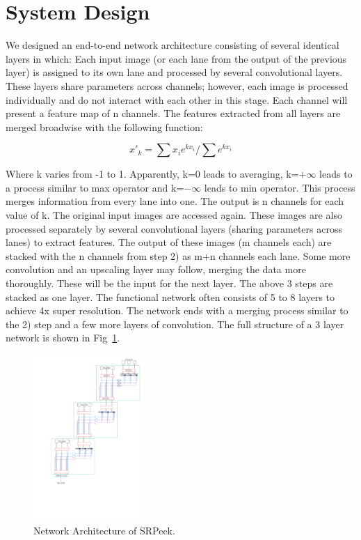 \section{System Design}
\label{sec-design}
We designed an end-to-end network architecture consisting of several identical layers in which:
	Each input image (or each lane from the output of the previous layer) is assigned to its own lane and processed by several convolutional layers. These layers share parameters across channels; however, each image is processed individually and do not interact with each other in this stage. Each channel will present a feature map of n channels.
	The features extracted from all layers are merged broadwise with the following function:


    $${x'_k=\sum x_ie^{kx_i}/\sum e^{kx_i}}$$


Where k varies from -1 to 1. Apparently, k=0 leads to averaging, k=${+\infty}$ leads to a process similar to max operator and k=${-\infty}$ leads to min operator. This process merges information from every lane into one. The output is n channels for each value of k. 
	The original input images are accessed again. These images are also processed separately by several convolutional layers (sharing parameters across lanes) to extract features. The output of these images (m channels each) are stacked with the n channels from step 2) as m+n channels each lane. Some more convolution and an upscaling layer may follow, merging the data more thoroughly. These will be the input for the next layer.
The above 3 steps are stacked as one layer. The functional network often consists of 5 to 8 layers to achieve 4x super resolution. The network ends with a merging process similar to the 2) step and a few more layers of convolution. The full structure of a 3 layer network is shown in Fig~\ref{fig-system}.

\begin{figure}
 \centering
    \includegraphics[width=0.375\textwidth]{./pic/system}
    \caption{Network Architecture of SRPeek.}
    \label{fig-system}
\end{figure}
